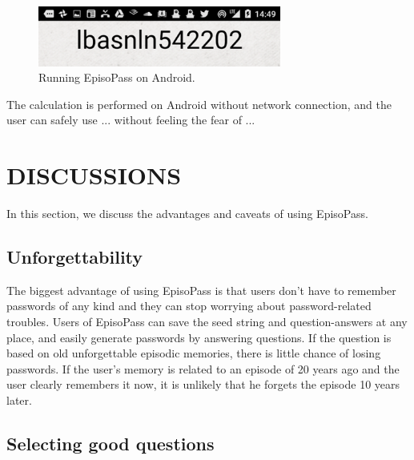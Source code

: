 \documentclass{article}
\begin{document}
\begin{figure}[H]
\includegraphics[width=80mm,bb=-30 0 400 106]{figures/ba8f5aeaa935ad63437969f4d746746b.png}
\caption{Running EpisoPass on Android.}
\label{android2}
\end{figure}


The calculation is performed on Android without network connection,
and the user can safely use ...
without feeling the fear of ...


\section{DISCUSSIONS}

In this section, we discuss the advantages and caveats of
using EpisoPass.

\subsection{Unforgettability}

The biggest advantage of using EpisoPass is that
users don't have to remember passwords of any kind and
they can stop worrying about password-related troubles.
%
Users of EpisoPass can save the seed string and question-answers
at any place, and easily generate passwords by answering questions.
If the question is based on old unforgettable episodic memories,
there is little chance of losing passwords.
If the user's memory is related to an episode of 20 years ago and the user clearly
remembers it now, it is unlikely that he forgets the episode 10 years later.

\subsection{Selecting good questions}
\end{document}
